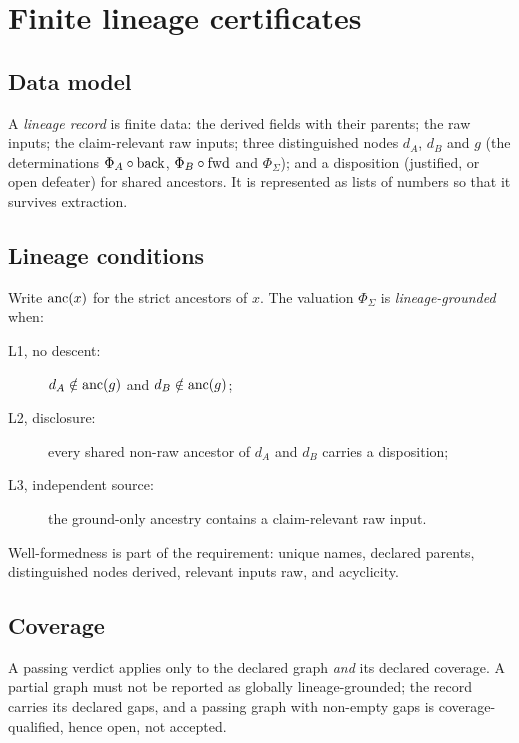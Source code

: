 \section{Finite lineage certificates}\label{sec:lineage}

\subsection{Data model}
A \emph{lineage record} is finite data: the derived fields with their parents; the raw inputs; the claim-relevant raw inputs; three distinguished nodes $d_A$, $d_B$ and $g$ (the determinations $\Phi_A \circ \mathrm{back}$, $\Phi_B \circ \mathrm{fwd}$ and $\Phi_\Sigma$); and a disposition (justified, or open defeater) for shared ancestors. It is represented as lists of numbers so that it survives extraction.

\subsection{Lineage conditions}
Write $\mathrm{anc}(x)$ for the strict ancestors of $x$. The valuation $\Phi_\Sigma$ is \emph{lineage-grounded} when:
\begin{description}
\item[L1, no descent:] $d_A \notin \mathrm{anc}(g)$ and $d_B \notin \mathrm{anc}(g)$;
\item[L2, disclosure:] every shared non-raw ancestor of $d_A$ and $d_B$ carries a disposition;
\item[L3, independent source:] the ground-only ancestry contains a claim-relevant raw input.
\end{description}
Well-formedness is part of the requirement: unique names, declared parents, distinguished nodes derived, relevant inputs raw, and acyclicity.

\subsection{Coverage}
A passing verdict applies only to the declared graph \emph{and} its declared coverage. A partial graph must not be reported as globally lineage-grounded; the record carries its declared gaps, and a passing graph with non-empty gaps is coverage-qualified, hence open, not accepted.

